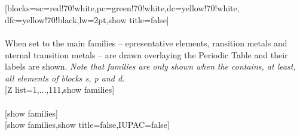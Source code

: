\\ [5pt]\makebox[\linewidth][c]{\scalebox{.6}{\pgfPT[blocks={sc=red!70!white,pc=green!70!white,dc=yellow!70!white,lw=2pt},show title=false,Z list=spd]}}%
\\ [10pt][blocks={sc=red!70!white,pc=green!70!white,dc=yellow!70!white, dfc=yellow!70!black,lw=2pt},show title=false]%
\\ [5pt]\makebox[\linewidth][c]{\scalebox{.6}{\pgfPT[blocks={sc=red!70!white,pc=green!70!white,dc=yellow!70!white, dfc=yellow!70!black,lw=2pt},show title=false]}}%
\\ [0pt]\pgfPTendstyle%
\newpage%
\label{option_show families}%
%
{When set to  the main families -- epresentative elements, ransition metals and nternal transition metals -- are drawn overlaying the Periodic Table and their labels are shown. \textit{Note that families are only shown when the  contains, at least, all elements of blocks s, p and d}.
}%
\\ [5pt][Z list={1,...,111},show families]%
\\ [5pt]\makebox[\linewidth][c]{\scalebox{.6}{\pgfPT[Z list={1,...,111},show families]}}%
\\ [10pt][show families]%
\\ [5pt]\makebox[\linewidth][c]{\scalebox{.6}{\pgfPT[show families]}}%
\newpage%
[show families,show title=false,IUPAC=false]%
\\ [5pt]\makebox[\linewidth][c]{\scalebox{.6}{\pgfPT[show families,show title=false,IUPAC=false]}}%
